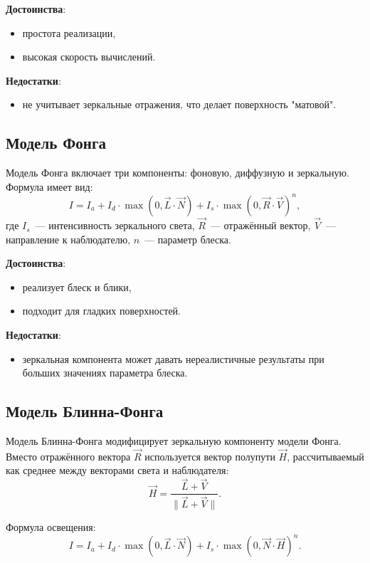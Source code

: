 \textbf{Достоинства}:
\begin{itemize}
    \item простота реализации,
    \item высокая скорость вычислений.
\end{itemize}

\textbf{Недостатки}:
\begin{itemize}
    \item не учитывает зеркальные отражения, что делает поверхность "матовой".
\end{itemize}



\subsection{Модель Фонга}

Модель Фонга включает три компоненты: фоновую, диффузную и зеркальную. 
Формула имеет вид:
\[
I = I_a + I_d \cdot \max(0, \vec{L} \cdot \vec{N}) + I_s \cdot \max(0, \vec{R} \cdot \vec{V})^n,
\]
где 
\( I_s \)~--- интенсивность зеркального света, 
\( \vec{R} \)~--- отражённый вектор, 
\( \vec{V} \)~--- направление к наблюдателю, 
\( n \)~--- параметр блеска.

\textbf{Достоинства}:
\begin{itemize}
    \item реализует блеск и блики,
    \item подходит для гладких поверхностей.
\end{itemize}

\textbf{Недостатки}:
\begin{itemize}
    \item зеркальная компонента может давать нереалистичные результаты при больших значениях параметра блеска.
\end{itemize}

\subsection{Модель Блинна-Фонга}

Модель Блинна-Фонга модифицирует зеркальную компоненту модели Фонга. Вместо отражённого вектора \( \vec{R} \) используется вектор полупути \( \vec{H} \), рассчитываемый как среднее между векторами света и наблюдателя:
\[
\vec{H} = \frac{\vec{L} + \vec{V}}{\|\vec{L} + \vec{V}\|}.
\]

Формула освещения:
\[
I = I_a + I_d \cdot \max(0, \vec{L} \cdot \vec{N}) + I_s \cdot \max(0, \vec{N} \cdot \vec{H})^n.
\]

